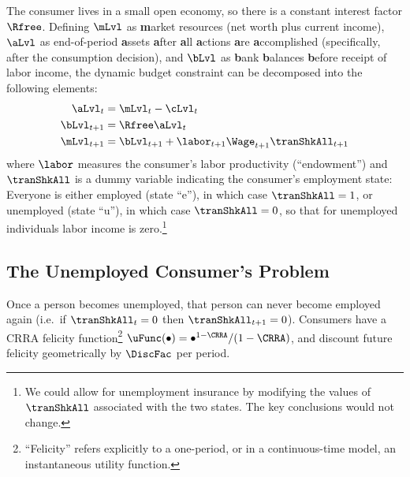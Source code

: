 \documentclass{econark}
\begin{document}
The consumer lives in a small open economy, so there is a constant interest factor $\Rfree$.  Defining $\mLvl$ as \textbf{m}arket resources (net worth plus current income), $\aLvl$ as end-of-period \textbf{a}ssets \textbf{a}fter \textbf{a}ll \textbf{a}ctions \textbf{a}re \textbf{a}ccomplished (specifically, after the consumption decision), and $\bLvl$ as \textbf{b}ank \textbf{b}alances \textbf{b}efore receipt of labor income, the dynamic budget constraint can be decomposed into the following elements:
\begin{equation}\begin{gathered}\begin{aligned}
    \aLvl_{t} & =  \mLvl_{t}-\cLvl_{t}
\\  \bLvl_{t+1} & =  \Rfree \aLvl_{t}
\\  \mLvl_{t+1} & =  \bLvl_{t+1}+\labor_{t+1}\Wage_{t+1}\tranShkAll_{t+1}  \label{eq:DBC}
\end{aligned}\end{gathered}\end{equation}
where $\labor$ measures the consumer's labor productivity (``endowment'') and $\tranShkAll$ is a dummy variable indicating the consumer's employment state: Everyone is either employed (state ``e''), in which case $\tranShkAll = 1$, or unemployed (state ``u''), in which case $\tranShkAll=0$, so that for unemployed individuals labor income is zero.\footnote{We could allow for unemployment insurance by modifying the values of $\tranShkAll$ associated with the two states.  The key conclusions would not change.}

\pagebreak 
\subsection{The Unemployed Consumer's Problem} \label{subsec:Fred}

Once a person becomes unemployed, that person can never become
employed again (i.e.\ if $\tranShkAll_{t}=0$ then $\tranShkAll_{t+1}=0$).
Consumers have a CRRA felicity function\footnote{``Felicity'' refers
  explicitly to a one-period, or in a continuous-time model, an
  instantaneous utility function.}
$\uFunc(\bullet)= \bullet^{1-\CRRA}/(1-\CRRA)$, and discount
future felicity geometrically by $\DiscFac$ per period.
\end{document}
